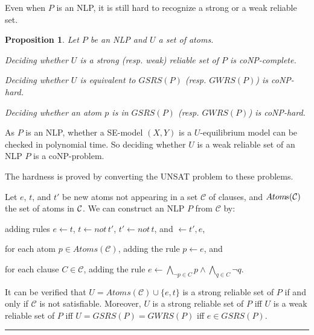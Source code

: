 \documentclass{article}
\newenvironment{tight_itemize}{
\begin{itemize}
   \setlength{\itemsep}{0pt}%
  \setlength{\topsep}{0pt}%
  \setlength{\partopsep}{0pt}%
  \setlength{\parskip}{0pt}%
  \setlength{\parsep}{0pt}%
}{\end{itemize}}
\newtheorem{proposition}{Proposition}
\newenvironment{proofs}{{\bf Proof Sketch:}}{\rule{2mm}{2mm}\\[-.5em] }
\newcommand{\Not}{not \,}
\newcommand{\Atom}{Atom\!s}
\newcommand{\GSRS}{G\!S\!R\!S}
\newcommand{\GWRS}{G\!W\!R\!S}
\begin{document}
Even when $P$ is an NLP, it is still hard to recognize a strong or a weak reliable set.
\begin{proposition}
  Let $P$ be an NLP and $U$ a set of atoms.
  \begin{tight_itemize}
    \item Deciding whether $U$ is a strong (resp. weak) reliable set of $P$ is coNP-complete.
    \item Deciding whether $U$ is equivalent to $\GSRS(P)$ (resp. $\GWRS(P)$) is coNP-hard.
    \item Deciding whether an atom $p$ is in $\GSRS(P)$ (resp. $\GWRS(P)$) is coNP-hard.
  \end{tight_itemize}
\end{proposition}
\begin{proofs}
  As $P$ is an NLP, whether a SE-model $(X, Y)$ is a $U$-equilibrium model can be checked in polynomial time. So deciding whether $U$ is a weak reliable set of an NLP $P$ is a coNP-problem.

  The hardness is proved by converting the UNSAT problem to these problems.

  Let $e$, $t$, and $t'$ be new atoms not appearing in a set $\mathcal{C}$ of clauses, and $\Atom(\cal C)$ the set of atoms in $\cal C$. We can construct an NLP $P$ from $\mathcal{C}$ by:
  \begin{tight_itemize}
    \item adding rules $e \gets t$, $t \gets \Not t'$, $t'\gets \Not t$, and $\gets t', e$,
    \item for each atom $p\in \Atom(\mathcal{C})$, adding the rule $p\gets e$, and
    \item for each clause $C\in \mathcal{C}$, adding the rule $e \gets \bigwedge_{\neg p\in C} p \land \bigwedge_{q \in C} \neg q$.
  \end{tight_itemize}
  \begin{comment}
  If $\mathcal{C}$ is not satisfiable, then the only SE-model of $P$ is $( \Atom(\mathcal{C})\cup \{e, t\}, \Atom(\mathcal{C})\cup \{e, t\})$. We can verify that the set $U = \Atom(\mathcal{C})\cup \{e, t\}$ is a strong reliable set of $P$.

  If $\mathcal{C}$ is satisfiable, then there exists some set $M\subseteq \Atom(\mathcal{C}})$ such that $(M\cup \{t'\}, M\cup \{t'\})$ is a SE-model of $P$, and $U$ is not a strong reliable set of $P$.
  \end{comment}
  It can be verified that $U = \Atom(\mathcal{C})\cup \{e, t\}$ is a strong reliable set of $P$ if and only if $\mathcal{C}$ is not satisfiable.
  Moreover, $U$ is a strong reliable set of $P$ if{f} $U$ is a weak reliable set of $P$ if{f} $U= \GSRS(P) = \GWRS(P)$ if{f} $e\in \GSRS(P)$.
\end{proofs}
\end{document}
